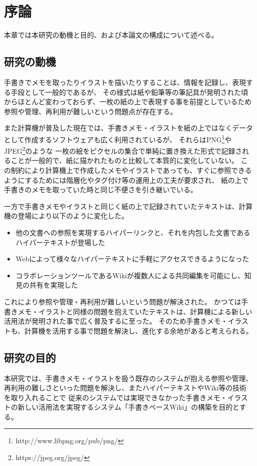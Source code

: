 \chapter{序論}
\label{chap:introduction}

本章では本研究の動機と目的、および本論文の構成について述べる。

\newpage

\section{研究の動機}

手書きでメモを取ったりイラストを描いたりすることは、情報を記録し、表現する手段として一般的であるが、
その様式は紙や鉛筆等の筆記具が発明された頃からほとんど変わっておらず、一枚の紙の上で表現する事を前提としているため
参照や管理、再利用が難しいという問題点が存在する。

また計算機が普及した現在では、手書きメモ・イラストを紙の上ではなくデータとして作成するソフトウェアも広く利用されているが、
それらはPNG\footnote{http://www.libpng.org/pub/png/}や JPEG\footnote{https://jpeg.org/jpeg/}のような
一枚の絵をピクセルの集合で単純に置き換えた形式で記録されることが一般的で、紙に描かれたものと比較して本質的に変化していない。
この制約により計算機上で作成したメモやイラストであっても、すぐに参照できるようにするためには階層化やタグ付け等の運用上の工夫が要求され、
紙の上で手書きのメモを取っていた時と同じ不便さを引き継いでいる。

一方で手書きメモやイラストと同じく紙の上で記録されていたテキストは、計算機の登場により以下のように変化した。
\begin{itemize}
    \item 他の文書への参照を実現するハイパーリンクと、それを内包した文書であるハイパーテキストが登場した
    \item Webによって様々なハイパーテキストに手軽にアクセスできるようになった
    \item コラボレーションツールであるWikiが複数人による共同編集を可能にし、知見の共有を実現した
\end{itemize}

これにより参照や管理・再利用が難しいという問題が解決された。
かつては手書きメモ・イラストと同様の問題を抱えていたテキストは、計算機による新しい活用法が発明された事で広く普及するに至った。
そのため手書きメモ・イラストも、計算機を活用する事で問題を解決し、進化する余地があると考えられる。

\section{研究の目的}
本研究では、手書きメモ・イラストを扱う既存のシステムが抱える参照や管理、再利用の難しさといった問題を解決し、またハイパーテキストやWiki等の技術を取り入れることで
従来のシステムでは実現できなかった手書きメモ・イラストの新しい活用法を実現するシステム「手書きベースWiki」の構築を目的とする。


